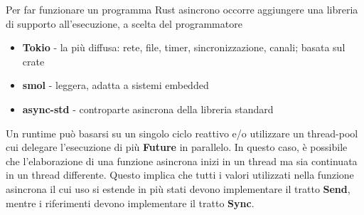 





Per far funzionare un programma Rust asincrono occorre aggiungere una libreria di
supporto all'esecuzione, a scelta del programmatore

\begin{itemize}
  \item \textbf{Tokio} - la più diffusa: rete, file, timer, sincronizzazione, canali; basata sul crate
  \item \textbf{smol} - leggera, adatta a sistemi embedded
  \item \textbf{async-std} - controparte asincrona della libreria standard
\end{itemize}



Un runtime può basarsi su un singolo ciclo reattivo e/o utilizzare un thread-pool cui
delegare l'esecuzione di più \textbf{Future} in parallelo.
In questo caso, è possibile che l'elaborazione di una funzione asincrona inizi in un thread ma sia
continuata in un thread differente.
Questo implica che tutti i valori utilizzati nella funzione asincrona il cui uso si estende in più stati
devono implementare il tratto \textbf{Send}, mentre i riferimenti devono implementare il tratto \textbf{Sync}.


